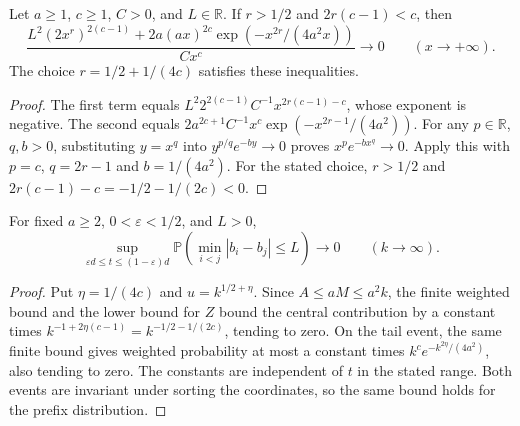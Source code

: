 \begin{lemma}
\label{lem:gap-majorant-decay}
\leanok
Let $a\geq1$, $c\geq1$, $C>0$, and $L\in\mathbb R$.
If $r>1/2$ and $2r(c-1)<c$, then
\[
 \frac{L^2(2x^r)^{2(c-1)}+
  2a(ax)^{2c}\exp(-x^{2r}/(4a^2x))}{Cx^c}
 \longrightarrow0\qquad(x\to+\infty).
\]
The choice $r=1/2+1/(4c)$ satisfies these inequalities.
\end{lemma}
\begin{proof}
The first term equals $L^2 2^{2(c-1)}C^{-1}x^{2r(c-1)-c}$,
whose exponent is negative. The second equals
$2a^{2c+1}C^{-1}x^c\exp(-x^{2r-1}/(4a^2))$.
For any $p\in\mathbb R$, $q,b>0$, substituting $y=x^q$ into
$y^{p/q}e^{-by}\to0$ proves $x^p e^{-bx^q}\to0$.
Apply this with $p=c$, $q=2r-1$ and $b=1/(4a^2)$.
For the stated choice, $r>1/2$ and
$2r(c-1)-c=-1/2-1/(2c)<0$.
\end{proof}

\begin{lemma}
\label{lem:prefix-separation}
\leanok
For fixed $a\geq2$, $0<\varepsilon<1/2$, and $L>0$,
\[
 \sup_{\varepsilon d\leq t\leq(1-\varepsilon)d}
 \mathbb P\left(\min_{i<j}|b_i-b_j|\leq L\right)\longrightarrow0
 \qquad(k\to\infty).
\]
\end{lemma}
\begin{proof}
Put $\eta=1/(4c)$ and $u=k^{1/2+\eta}$. Since $A\leq aM\leq a^2k$,
the finite weighted bound and the lower bound for $Z$ bound the central
contribution by a constant times
$k^{-1+2\eta(c-1)}=k^{-1/2-1/(2c)}$, tending to zero. On the tail
event, the same finite bound gives weighted probability at most a
constant times $k^c e^{-k^{2\eta}/(4a^2)}$, also tending to zero.
The constants are independent of $t$ in the stated range. Both events
are invariant under sorting the coordinates, so the same bound
holds for the prefix distribution.
\end{proof}

